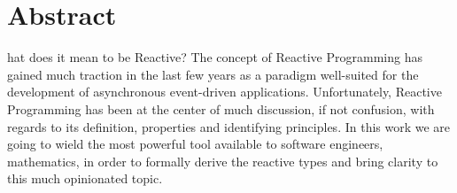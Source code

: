 %
%
%

\chapter*{Abstract}
\begin{SingleSpace}
hat does it mean to be Reactive? The concept of Reactive Programming has gained much traction in the last few years as a paradigm well-suited for the development of asynchronous  event-driven applications. Unfortunately, Reactive Programming has been at the center of much discussion, if not confusion, with regards to its definition, properties and identifying principles. In this work we are going to wield the most powerful tool available to software engineers, mathematics, in order to formally derive the reactive types and bring clarity to this much opinionated topic.
\end{SingleSpace}
\clearpage